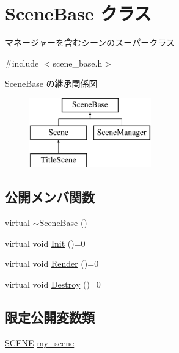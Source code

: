 \hypertarget{class_scene_base}{}\section{Scene\+Base クラス}
\label{class_scene_base}


マネージャーを含むシーンのスーパークラス  




{\ttfamily \#include $<$scene\+\_\+base.\+h$>$}

Scene\+Base の継承関係図\begin{figure}[H]
\begin{center}
\leavevmode
\includegraphics[height=3.000000cm]{class_scene_base}
\end{center}
\end{figure}
\subsection*{公開メンバ関数}
\begin{DoxyCompactItemize}
\item 
virtual \mbox{\hyperlink{class_scene_base_a187dd160e5a16909bcc6529851e38318}{$\sim$\+Scene\+Base}} ()
\item 
virtual void \mbox{\hyperlink{class_scene_base_a24d7db43c819924dc8b07b436f6d3148}{Init}} ()=0
\item 
virtual void \mbox{\hyperlink{class_scene_base_ad981674ce731ea267f398e889bbb9dc3}{Render}} ()=0
\item 
virtual void \mbox{\hyperlink{class_scene_base_a7c5b54020bc519b4dadfe9770d6b27f7}{Destroy}} ()=0
\end{DoxyCompactItemize}
\subsection*{限定公開変数類}
\begin{DoxyCompactItemize}
\item 
\mbox{\hyperlink{scene__base_8h_a24cee5343fb9d0706ead6e8601f363be}{S\+C\+E\+NE}} \mbox{\hyperlink{class_scene_base_a18dcdbacfbd98f73099c3cbeb70ae3b8}{my\+\_\+scene}}
\end{DoxyCompactItemize}


